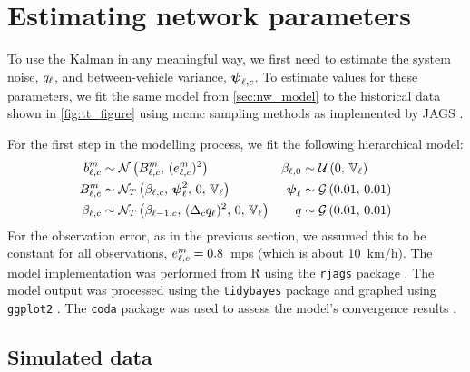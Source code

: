 
\section{Estimating network parameters}
\label{sec:nw_par_est}


To use the Kalman in any meaningful way, we first need to estimate the system noise, $q_\ell$, and between-vehicle variance, $\mathbf{\boldsymbol{\psi}}_{\ell,c}$. To estimate values for these parameters, we fit the same model from \cref{sec:nw_model} to the historical data shown in \cref{fig:tt_figure} using \gls{mcmc} sampling methods as implemented by JAGS \citep{JAGS}.


For the first step in the modelling process, we fit the following hierarchical model:
\begin{align}
\label{eq:nw_model_simple}
b_{\ell,c}^m &\sim \mathcal{N}\left(B_{\ell,c}^m,\, (e_{\ell,c}^m)^2\right) &
\beta_{\ell,0} &\sim \mathcal{U}\left(0,\, \mathbb{V}_\ell\right) \nonumber \\
B_{\ell,c}^m &\sim \mathcal{N}_T\left(\beta_{\ell,c},\, \mathbf{\boldsymbol{\psi}}_{\ell}^2,\, 0,\, \mathbb{V}_\ell\right) &
\mathbf{\boldsymbol{\psi}}_\ell &\sim \mathcal{G}\left(0.01,\, 0.01\right) \\
\beta_{\ell,c} &\sim \mathcal{N}_T\left(\beta_{\ell-1,c},\, (\Delta_c q_{\ell})^2,\, 0,\, \mathbb{V}_\ell\right) &
q &\sim \mathcal{G}\left(0.01,\, 0.01\right) \nonumber
\end{align}
For the observation error, as in the previous section, we assumed this to be constant for all observations, $e_{\ell,c}^m = 0.8$~\gls{mps} (which is about 10~km/h). The model implementation was performed from R using the \verb+rjags+ package \citep{rjags}. The model output was processed using the \verb+tidybayes+ package \citep{tidybayes} and graphed using \verb+ggplot2+ \citep{ggplot2}. The \verb+coda+ package was used to assess the model's convergence results \citep{coda}.


\subsection{Simulated data}
\label{nw_par_est_sim}

